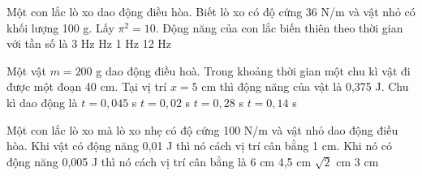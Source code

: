 \begin{ex}%
Một con lắc lò xo dao động điều hòa. Biết lò xo có độ cứng 36 N/m và vật nhỏ có khối lượng 100 g. Lấy $\pi^2 = 10$. Động năng của con lắc biến thiên theo thời gian với tần số là
\choice
{3 Hz}
{ Hz}
{1 Hz}
{12 Hz}
\end{ex} 
\begin{ex}%
Một vật $m = 200$ g dao động điều hoà. Trong khoảng thời gian một chu kì vật đi được một đoạn 40 cm. Tại vị trí $x = 5$ cm thì động năng của vật là 0,375 J. Chu kì dao động là
\choice
{$t=0,045$ s}
{$t=0,02$ s}
{\True $t=0,28$ s}
{$t=0,14$ s}
\end{ex} 


\begin{ex} %
Một con lắc lò xo mà lò xo nhẹ có độ cứng 100 N/m và vật nhỏ dao động điều hòa. Khi vật có động năng 0,01 J thì nó cách vị trí cân bằng 1 cm. Khi nó có động năng 0,005 J thì nó cách vị trí cân bằng là
\choice
{6 cm}
{4,5 cm}
{\True $\sqrt{2}$ cm}
{3 cm}
\end{ex} 


